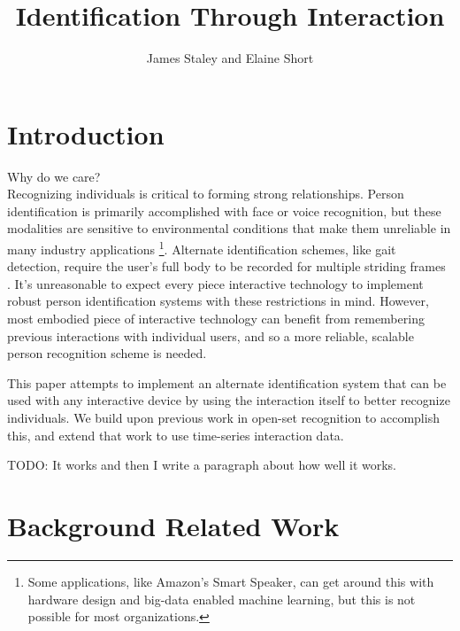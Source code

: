 \documentclass{article}
\title{Identification Through Interaction}
\author{James Staley and Elaine Short}
\date{\vspace{-1em}}
\begin{document}
\maketitle


\section{Introduction}

Why do we care?\\

Recognizing individuals is critical to forming strong relationships. Person identification is primarily accomplished with face or voice recognition, but these modalities are sensitive to environmental conditions that make them unreliable in many industry applications \footnote{Some applications, like Amazon's Smart Speaker, can get around this with hardware design and big-data enabled machine learning, but this is not possible for most organizations.}. Alternate identification schemes, like gait detection, require the user's full body to be recorded for multiple striding frames \cite{liang_wang_silhouette_2003}\cite{han_individual_2006}. It's unreasonable to expect every piece interactive technology to implement robust person identification systems with these restrictions in mind. However, most embodied piece of interactive technology can benefit from remembering previous interactions with individual users, and so a more reliable, scalable person recognition scheme is needed. 

This paper attempts to implement an alternate identification system that can be used with any interactive device by using the interaction itself to better recognize individuals. We build upon previous work in open-set recognition to accomplish this, and extend that work to use time-series interaction data. 

TODO: It works and then I write a paragraph about how well it works.

\section{Background Related Work}
\end{document}
